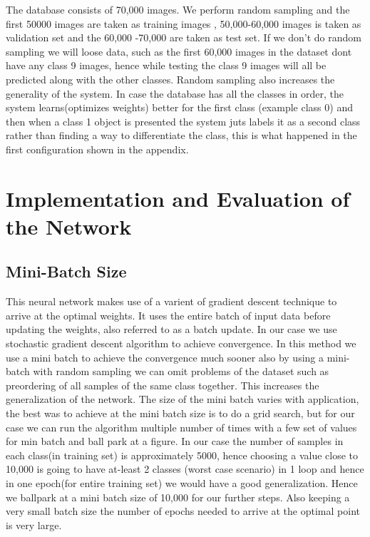 \documentclass[conference]{IEEEtran}
\begin{document}
The database consists of 70,000 images. We perform random sampling and the first 50000 images are taken as training images , 50,000-60,000 images is taken as validation set and the 60,000 -70,000 are taken as test set. If we don't do random sampling we will loose data, such as the first 60,000 images in the dataset dont have any class 9 images, hence while testing the class 9 images will all be predicted along with the other classes. 
Random sampling also increases the generality of the system. In case the database has all the classes in order, the system learns(optimizes weights) better for the first class (example class 0) and then when a class 1 object is presented the system juts labels it as a second class rather than finding a way to differentiate the class, this is what happened in the first configuration shown in the appendix. 

\section{Implementation and Evaluation of the Network}
\subsection{Mini-Batch Size}
This neural network makes use of a varient of gradient descent technique to arrive at the optimal weights. It uses the entire batch of input data before updating the weights, also referred to as a batch update. In our case we use stochastic gradient descent algorithm to achieve convergence. In this method we use a mini batch to achieve the convergence much sooner also by using a mini-batch with random sampling we can omit problems of the dataset such as preordering of all samples of the same class together. This increases the generalization of the network. The size of the mini batch varies with application, the best was to achieve at the mini batch size is to do a grid search, but for our case we can run the algorithm multiple number of times with a few set of values for min batch and ball park at a figure. In our case the number of samples in each class(in training set) is approximately 5000, hence choosing a value close to 10,000 is going to have at-least 2 classes (worst case scenario) in 1 loop and hence in one epoch(for entire training set) we would have a good generalization. Hence we ballpark at a mini batch size of 10,000 for our further steps. Also keeping a very small batch size the number of epochs needed to arrive at the optimal point is very large.
\end{document}
